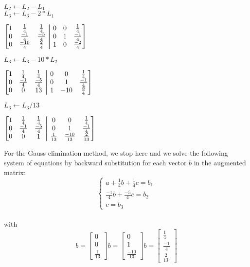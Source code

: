 \documentclass[12pt]{article}
\newcommand\aug{\fboxsep=-\fboxrule\!\!\!\fbox{\strut}\!\!\!}
\begin{document}
\noindent $L_2 \gets L_2 - L_1$ \\
$L_3 \gets L_3 - 2 * L_1$ \\
\begin{center}
$\begin{bmatrix}
1 & \frac{1}{4} & \frac{1}{4} & \aug & 0 & 0 & \frac{1}{4} \\
0 & \frac{-1}{4} & \frac{-5}{4} & \aug & 0 & 1 & \frac{-1}{4} \\
0 & \frac{-10}{4} & \frac{2}{4} & \aug & 1 & 0 & \frac{-2}{4} \\
\end{bmatrix}$
\end{center}

\noindent $L_3 \gets L_3 - 10 * L_2$ \\
\begin{center}
$\begin{bmatrix}
1 & \frac{1}{4} & \frac{1}{4} & \aug & 0 & 0 & \frac{1}{4} \\
0 & \frac{-1}{4} & \frac{-5}{4} & \aug & 0 & 1 & \frac{-1}{4} \\
0 & 0 & 13 & \aug & 1 & -10 & \frac{8}{4} \\
\end{bmatrix}$
\end{center}


\noindent $L_3 \gets L_3/13$ \\
\begin{center}
$\begin{bmatrix}
1 & \frac{1}{4} & \frac{1}{4} & \aug & 0 & 0 & \frac{1}{4} \\
0 & \frac{-1}{4} & \frac{-5}{4} & \aug & 0 & 1 & \frac{-1}{4} \\
0 & 0 & 1 & \aug & \frac{1}{13} & \frac{-10}{13} & \frac{2}{13} \\
\end{bmatrix}$
\end{center}

\noindent For the Gauss elimination method, we stop here and we solve the following system of equations by backward substitution for each vector $b$ in the augmented matrix: \\
$$\begin{cases}
  a + \frac{1}{4}b + \frac{1}{4}c = b_1 \\
  \frac{-1}{4}b + \frac{-5}{4}c = b_2 \\
  c = b_3
\end{cases}$$ \\

with $$ b = \begin{bmatrix}
  0 \\
  0 \\
  \frac{1}{13}
\end{bmatrix} b = \begin{bmatrix}
  0 \\
  1 \\
  \frac{-10}{13}
\end{bmatrix} b = \begin{bmatrix}
  \frac{1}{4} \\
  \frac{-1}{4} \\
  \frac{2}{13}
\end{bmatrix} $$ \\
\end{document}
